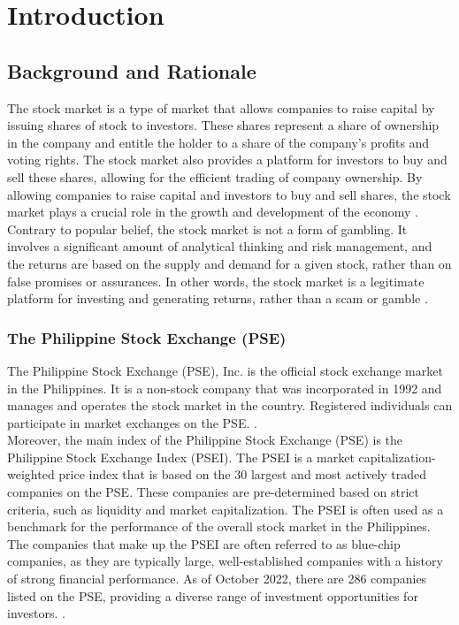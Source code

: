 \chapter{Introduction}
\label{sec:researchdesc}

\section{Background and Rationale}
\label{sec:background}
The stock market is a type of market that allows companies to raise capital 
by issuing shares of stock to investors. These shares represent a share of 
ownership in the company and entitle the holder to a share of the company's 
profits and voting rights. The stock market also provides a platform for 
investors to buy and sell these shares, allowing for the efficient trading of 
company ownership. By allowing companies to raise capital and investors to buy and 
sell shares, the stock market plays a crucial role in the growth and development 
of the economy
\cite{Chen2022, TheEconomicTimes}.
\\Contrary to popular belief, the stock market is not a form of gambling. 
It involves a significant amount of analytical thinking and risk management, 
and the returns are based on the supply and demand for a given stock, rather 
than on false promises or assurances. In other words, the stock market is a 
legitimate platform for investing and generating returns, rather than a scam or 
gamble
\cite{Schwab-Pomerantz2021,Adams2022,Summers2022}.

\subsection{The Philippine Stock Exchange (PSE)}
The Philippine Stock Exchange (PSE), Inc. is the official stock exchange 
market in the Philippines. It is a non-stock company that was incorporated 
in 1992 and manages and operates the stock market in the country. Registered 
individuals can participate in market exchanges on the PSE.
\cite{PSECompanyInfo}.
\\Moreover, the main index of the Philippine Stock Exchange (PSE) 
is the Philippine Stock Exchange Index (PSEI). The PSEI is a market 
capitalization-weighted price index that is based on the 30 largest and 
most actively traded companies on the PSE. These companies are pre-determined 
based on strict criteria, such as liquidity and market capitalization. 
The PSEI is often used as a benchmark for the performance of the overall stock 
market in the Philippines.  
\cite{BSP}
The companies that make up the PSEI are often referred to as blue-chip companies, 
as they are typically large, well-established companies with a history of strong 
financial performance. As of October 2022, there are 286 companies listed on the PSE,
 providing a diverse range of investment opportunities for investors. 
\cite{Fayed2022, PSECompanyList}.

